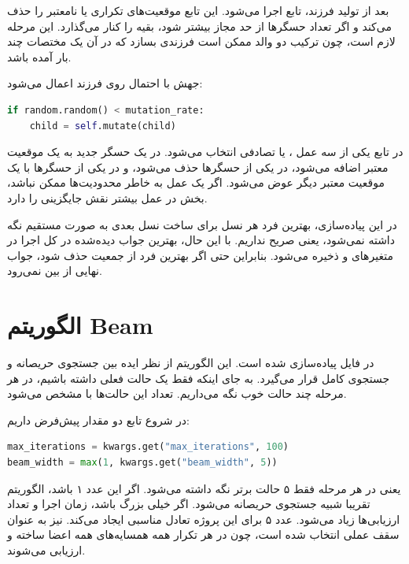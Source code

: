\documentclass[10.5pt]{exam}
\begin{document}
بعد از تولید فرزند، تابع
اجرا می‌شود. این تابع موقعیت‌های تکراری یا نامعتبر را حذف می‌کند و اگر تعداد حسگرها از حد مجاز بیشتر شود، بقیه را کنار می‌گذارد. این مرحله لازم است، چون ترکیب دو والد ممکن است فرزندی بسازد که در آن یک مختصات چند بار آمده باشد.

جهش با احتمال
روی فرزند اعمال می‌شود:

\begin{latin}
\begin{lstlisting}[language=Python]
if random.random() < mutation_rate:
    child = self.mutate(child)
\end{lstlisting}
\end{latin}

در تابع
یکی از سه عمل
،
یا
تصادفی انتخاب می‌شود. در
یک حسگر جدید به یک موقعیت معتبر اضافه می‌شود، در
یکی از حسگرها حذف می‌شود، و در
یکی از حسگرها با یک موقعیت معتبر دیگر عوض می‌شود. اگر یک عمل به خاطر محدودیت‌ها ممکن نباشد، بخش
در عمل بیشتر نقش جایگزینی را دارد.

در این پیاده‌سازی، بهترین فرد هر نسل برای ساخت نسل بعدی به صورت مستقیم نگه داشته نمی‌شود، یعنی
صریح نداریم. با این حال، بهترین جواب دیده‌شده در کل اجرا در متغیرهای
و
ذخیره می‌شود. بنابراین حتی اگر بهترین فرد از جمعیت حذف شود، جواب نهایی از بین نمی‌رود.

\section{الگوریتم Beam}
در فایل
پیاده‌سازی شده است. این الگوریتم از نظر ایده بین جستجوی حریصانه و جستجوی کامل قرار می‌گیرد. به جای اینکه فقط یک حالت فعلی داشته باشیم، در هر مرحله چند حالت خوب نگه می‌داریم. تعداد این حالت‌ها با
مشخص می‌شود.

در شروع تابع
دو مقدار پیش‌فرض داریم:

\begin{latin}
\begin{lstlisting}[language=Python]
max_iterations = kwargs.get("max_iterations", 100)
beam_width = max(1, kwargs.get("beam_width", 5))
\end{lstlisting}
\end{latin}

یعنی در هر مرحله فقط ۵ حالت برتر نگه داشته می‌شود. اگر این عدد ۱ باشد، الگوریتم تقریبا شبیه جستجوی حریصانه می‌شود. اگر خیلی بزرگ باشد، زمان اجرا و تعداد ارزیابی‌ها زیاد می‌شود. عدد ۵ برای این پروژه تعادل مناسبی ایجاد می‌کند.
نیز به عنوان سقف عملی انتخاب شده است، چون در هر تکرار همه همسایه‌های همه اعضا ساخته و ارزیابی می‌شوند.
\end{document}
